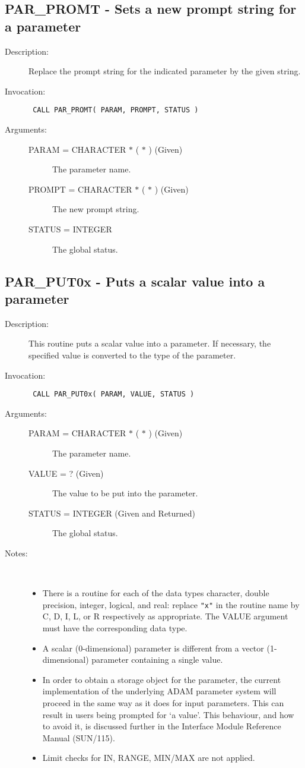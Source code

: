 \documentclass[twoside,11pt]{article}
\newcommand{\xref}[3]{#1}
\newcommand{\xlabel}[1]{}
\newlength{\sstbannerlength}
\newlength{\sstcaptionlength}
\newlength{\sstexampleslength}
\newlength{\sstexampleswidth}
\newcommand{\sstroutine}[3]{
   \goodbreak
   \rule{\textwidth}{0.5mm}
   \vspace{-7ex}
   \newline
   \settowidth{\sstbannerlength}{{\Large {\bf #1}}}
   \setlength{\sstcaptionlength}{\textwidth}
   \setlength{\sstexampleslength}{\textwidth}
   \addtolength{\sstbannerlength}{0.5em}
   \addtolength{\sstcaptionlength}{-2.0\sstbannerlength}
   \addtolength{\sstcaptionlength}{-5.0pt}
   \settowidth{\sstexampleswidth}{{\bf Examples:}}
   \addtolength{\sstexampleslength}{-\sstexampleswidth}
   \parbox[t]{\sstbannerlength}{\flushleft{\Large {\bf #1}}}
   \parbox[t]{\sstcaptionlength}{\center{\Large #2}}
   \parbox[t]{\sstbannerlength}{\flushright{\Large {\bf #1}}}
   \begin{description}
      #3
   \end{description}
}
\newcommand{\sstdescription}[1]{\item[Description:] #1}
\newcommand{\sstinvocation}[1]{\item[Invocation:]\hspace{0.4em}{\tt #1}}
\newcommand{\sstarguments}[1]{
   \item[Arguments:] \mbox{} \\
   \vspace{-3.5ex}
   \begin{description}
      #1
   \end{description}
}
\newcommand{\sstsubsection}[1]{ \item[{#1}] \mbox{} \\}
\newcommand{\sstnotes}[1]{\item[Notes:] \mbox{} \\[1.3ex] #1}
\newcommand{\sstitemlist}[1]{
  \mbox{} \\
  \vspace{-7ex}
  \begin{itemize}
     #1
  \end{itemize}
}
\newcommand{\sstitem}{\item}
\newcommand{\ssttt}{\tt}
\renewcommand{\sstroutine}[3]{
      \subsection{\xlabel{12}#1\xlabel{#1}-\label{#1}#2}
      \begin{description}
         #3
      \end{description}
   }
\renewcommand{\sstdescription}[1]{\item[Description:]
      \begin{description}
         #1
      \end{description}
   }
\renewcommand{\sstinvocation}[1]{\item[Invocation:]
      \begin{description}
         {\ssttt #1}
      \end{description}
   }
\renewcommand{\sstarguments}[1]{
      \item[Arguments:]
      \begin{description}
         #1
      \end{description}
   }
\renewcommand{\sstsubsection}[1]{\item[{#1}]}
\renewcommand{\sstnotes}[1]{\item[Notes:]
      \begin{description}
         #1
      \end{description}
   }
\newcommand{\sstitemlist}[1]{
      \begin{itemize}
         #1
      \end{itemize}
   }
\begin{document}
\sstroutine{
   PAR\_PROMT
}{
   Sets a new prompt string for a parameter
}{
   \sstdescription{
      Replace the prompt string for the indicated parameter by the
      given string.
   }
   \sstinvocation{
      CALL PAR\_PROMT( PARAM, PROMPT, STATUS )
   }
   \sstarguments{
      \sstsubsection{
         PARAM = CHARACTER $*$ ( $*$ ) (Given)
      }{
         The parameter name.
      }
      \sstsubsection{
         PROMPT = CHARACTER $*$ ( $*$ ) (Given)
      }{
         The new prompt string.
      }
      \sstsubsection{
         STATUS = INTEGER
      }{
         The global status.
      }
   }
}

\sstroutine{
   PAR\_PUT0x
}{
   Puts a scalar value into a parameter
}{
   \sstdescription{
      This routine puts a scalar value into a parameter.  If necessary,
      the specified value is converted to the type of the parameter.
   }
   \sstinvocation{
      CALL PAR\_PUT0x( PARAM, VALUE, STATUS )
   }
   \sstarguments{
      \sstsubsection{
         PARAM = CHARACTER $*$ ( $*$ ) (Given)
      }{
         The parameter name.
      }
      \sstsubsection{
         VALUE = ? (Given)
      }{
         The value to be put into the parameter.
      }
      \sstsubsection{
         STATUS = INTEGER (Given and Returned)
      }{
         The global status.
      }
   }
   \sstnotes{
      \sstitemlist{

         \sstitem
         There is a routine for each of the data types character,
         double precision, integer, logical, and real: replace {\tt "x"} in the
         routine name by C, D, I, L, or R respectively as appropriate.  The
         VALUE argument must have the corresponding data type.

         \sstitem
         A scalar (0-dimensional) parameter is different from a vector
         (1-dimensional) parameter containing a single value.

         \sstitem
         In order to obtain a storage object for the parameter, the
         current implementation of the underlying ADAM parameter system
         will proceed in the same way as it does for input parameters.
         This can result in users being prompted for `a value'. This
         behaviour, and how to avoid it, is discussed further in the
         Interface Module Reference Manual 
         (\xref{SUN/115}{sun115}{parameter_specification_for_output_parameters}).

         \sstitem
         Limit checks for IN, RANGE, MIN/MAX are not applied.
      }
   }
}
\end{document}
